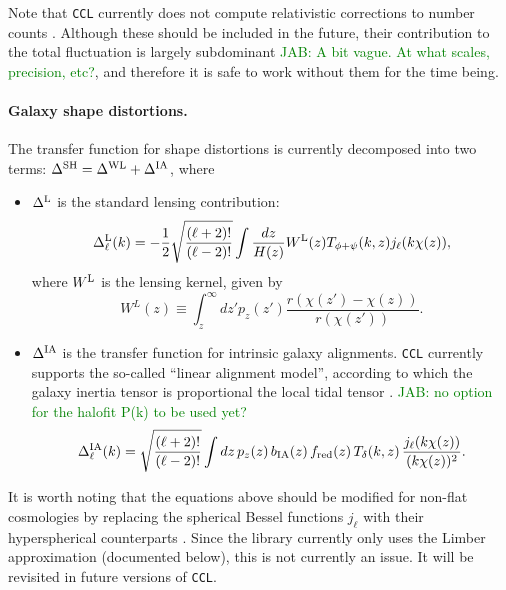 \documentclass[\docopts]{\docclass}
\newcommand{\jab}[1]{\textcolor{green}{JAB: #1}}
\begin{document}
\begin{itemize}
        Note that {\tt CCL} currently does not compute relativistic corrections to number counts \cite{2011PhRvD..84d3516C,2011PhRvD..84f3505B}. Although these should be included in the future, their contribution to the total fluctuation is largely subdominant \jab{A bit vague. At what scales, precision, etc?}, and therefore it is safe to work without them for the time being.
\end{itemize}

\paragraph{\bf Galaxy shape distortions.} The transfer function for shape distortions is currently decomposed into two terms: $\Delta^{\rm SH}=\Delta^{\rm WL}+\Delta^{\rm IA}$, where
\begin{itemize}
  \item $\Delta^{\rm L}$ is the standard lensing contribution:
        \begin{equation}
          \Delta_\ell^{\rm L}(k)=-\frac{1}{2}\sqrt{\frac{(\ell+2)!}{(\ell-2)!}}\int \frac{dz}{H(z)} W^{\rm L}(z) T_{\phi+\psi}(k,z) j_\ell(k\chi(z)),
        \end{equation}
        where $W^{\rm L}$ is the lensing kernel, given by
        \begin{equation}
          W^L(z)\equiv\int_z^\infty dz' p_z(z')\frac{r(\chi(z')-\chi(z))}{r(\chi(z'))}.
        \end{equation}
  \item $\Delta^{\rm IA}$ is the transfer function for intrinsic galaxy alignments. {\tt CCL} currently supports the so-called ``linear alignment model'', according to which the galaxy inertia tensor is proportional the local tidal tensor \cite{2004PhRvD..70f3526H,2007MNRAS.381.1197H}. \jab{no option for the halofit P(k) to be used yet?}
        \begin{equation}
          \Delta_\ell^{\rm IA}(k)=\sqrt{\frac{(\ell+2)!}{(\ell-2)!}}\int dz\,p_z(z)\,b_{\rm IA}(z)\,f_{\rm red}(z)\,T_\delta(k,z)\,\frac{j_\ell(k\chi(z))}{(k\chi(z))^2}.
        \end{equation}
\end{itemize}

It is worth noting that the equations above should be modified for non-flat cosmologies by replacing the spherical Bessel functions $j_\ell$ with their hyperspherical counterparts \cite{1994ApJ...432....7K}. Since the library currently only uses the Limber approximation (documented below), this is not currently an issue. It will be revisited in future versions of {\tt CCL}.
\end{document}
